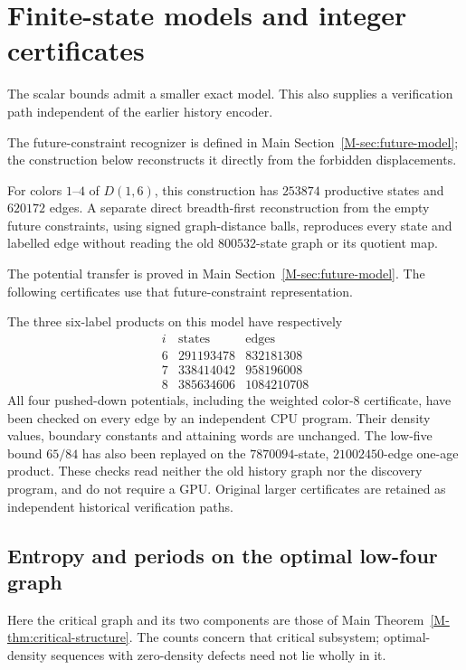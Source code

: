 \documentclass[11pt,reqno]{amsart}
\theoremstyle{plain}
\newcommand{\D}[1]{D(1,#1)}
\theoremstyle{plain}
\theoremstyle{plain}
\begin{document}
\section{Finite-state models and integer certificates}
\label{S-sec:future-constraints}

The scalar bounds admit a smaller exact model. This also supplies a
verification path independent of the earlier history encoder.

The future-constraint recognizer is defined in Main
Section~\ref*{M-sec:future-model}; the construction below reconstructs
it directly from the forbidden displacements.

For colors $1$--$4$ of $\D{6}$, this construction has $253874$
productive states and $620172$ edges. A separate direct breadth-first
reconstruction from the empty future constraints, using signed
graph-distance balls, reproduces every state and labelled edge without
reading the old $800532$-state graph or its quotient map.

The potential transfer is proved in Main
Section~\ref*{M-sec:future-model}. The following certificates use that
future-constraint representation.

The three six-label products on this model have respectively
\[
\begin{array}{c|r|r}
i&\text{states}&\text{edges}\\\hline
6&291193478&832181308\\
7&338414042&958196008\\
8&385634606&1084210708
\end{array}
\]
All four pushed-down potentials, including the weighted color-$8$
certificate, have been checked on every edge by an independent CPU
program. Their density values, boundary constants and attaining words
are unchanged. The low-five bound $65/84$ has also been replayed on
the $7870094$-state, $21002450$-edge one-age product. These checks
read neither the old history graph nor the discovery program, and do
not require a GPU. Original larger certificates are retained as
independent historical verification paths.



\subsection{Entropy and periods on the optimal low-four graph}\label{S-supp:critical-counts}
Here the critical graph and its two components are those of Main
Theorem~\ref*{M-thm:critical-structure}. The counts concern that critical
subsystem; optimal-density sequences with zero-density defects need not
lie wholly in it.
\end{document}
